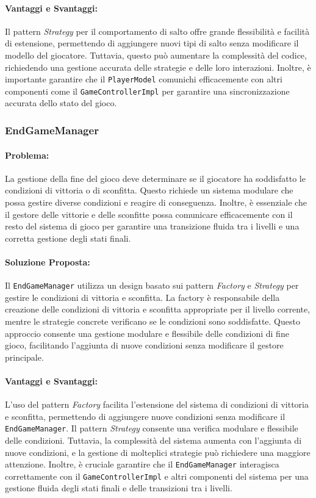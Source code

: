 \documentclass[a4paper,12pt]{report}
\begin{document}
	\paragraph{Vantaggi e Svantaggi:} 
	Il pattern \textit{Strategy} per il comportamento di salto offre grande flessibilità e facilità di estensione, permettendo di aggiungere nuovi tipi di salto senza modificare il modello del giocatore. Tuttavia, questo può aumentare la complessità del codice, richiedendo una gestione accurata delle strategie e delle loro interazioni. Inoltre, è importante garantire che il \texttt{PlayerModel} comunichi efficacemente con altri componenti come il \texttt{GameControllerImpl} per garantire una sincronizzazione accurata dello stato del gioco.
	
	\subsubsection{EndGameManager}
	
	\paragraph{Problema:} La gestione della fine del gioco deve determinare se il giocatore ha soddisfatto le condizioni di vittoria o di sconfitta. Questo richiede un sistema modulare che possa gestire diverse condizioni e reagire di conseguenza. Inoltre, è essenziale che il gestore delle vittorie e delle sconfitte possa comunicare efficacemente con il resto del sistema di gioco per garantire una transizione fluida tra i livelli e una corretta gestione degli stati finali.
	
	\paragraph{Soluzione Proposta:} Il \texttt{EndGameManager} utilizza un design basato sui pattern \textit{Factory} e \textit{Strategy} per gestire le condizioni di vittoria e sconfitta. La factory è responsabile della creazione delle condizioni di vittoria e sconfitta appropriate per il livello corrente, mentre le strategie concrete verificano se le condizioni sono soddisfatte. Questo approccio consente una gestione modulare e flessibile delle condizioni di fine gioco, facilitando l'aggiunta di nuove condizioni senza modificare il gestore principale.
	
	\paragraph{Vantaggi e Svantaggi:} 
	L'uso del pattern \textit{Factory} facilita l'estensione del sistema di condizioni di vittoria e sconfitta, permettendo di aggiungere nuove condizioni senza modificare il \texttt{EndGameManager}. Il pattern \textit{Strategy} consente una verifica modulare e flessibile delle condizioni. Tuttavia, la complessità del sistema aumenta con l'aggiunta di nuove condizioni, e la gestione di molteplici strategie può richiedere una maggiore attenzione. Inoltre, è cruciale garantire che il \texttt{EndGameManager} interagisca correttamente con il \texttt{GameControllerImpl} e altri componenti del sistema per una gestione fluida degli stati finali e delle transizioni tra i livelli.
	
\end{document}
